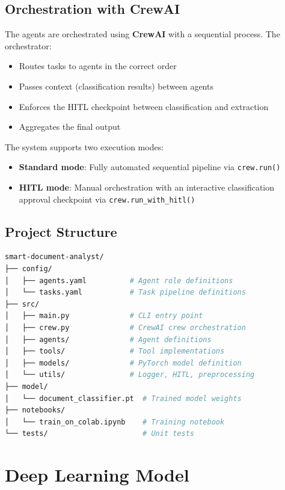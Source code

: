 \documentclass[12pt,a4paper]{article}
\begin{document}
\subsection{Orchestration with CrewAI}
The agents are orchestrated using \textbf{CrewAI} with a sequential process. The orchestrator:
\begin{itemize}
    \item Routes tasks to agents in the correct order
    \item Passes context (classification results) between agents
    \item Enforces the HITL checkpoint between classification and extraction
    \item Aggregates the final output
\end{itemize}

The system supports two execution modes:
\begin{itemize}
    \item \textbf{Standard mode}: Fully automated sequential pipeline via \texttt{crew.run()}
    \item \textbf{HITL mode}: Manual orchestration with an interactive classification approval checkpoint via \texttt{crew.run\_with\_hitl()}
\end{itemize}

\subsection{Project Structure}
\begin{lstlisting}[language=bash, caption=Repository structure]
smart-document-analyst/
├── config/
│   ├── agents.yaml          # Agent role definitions
│   └── tasks.yaml           # Task pipeline definitions
├── src/
│   ├── main.py              # CLI entry point
│   ├── crew.py              # CrewAI crew orchestration
│   ├── agents/              # Agent definitions
│   ├── tools/               # Tool implementations
│   ├── models/              # PyTorch model definition
│   └── utils/               # Logger, HITL, preprocessing
├── model/
│   └── document_classifier.pt  # Trained model weights
├── notebooks/
│   └── train_on_colab.ipynb    # Training notebook
└── tests/                      # Unit tests
\end{lstlisting}

\section{Deep Learning Model}
\end{document}
